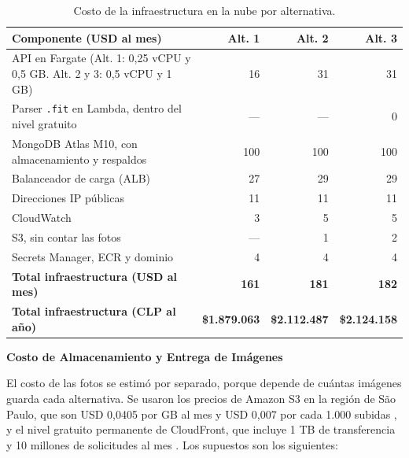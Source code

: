 \begin{table}[h!]
    \centering
    \renewcommand{\arraystretch}{1.25}
    \footnotesize
    \begin{tabular}{|>{\raggedright\arraybackslash}p{7.2cm}|r|r|r|}
        \hline
        \rowcolor[HTML]{EFEFEF}
        \textbf{Componente (USD al mes)} & \textbf{Alt. 1} & \textbf{Alt. 2} & \textbf{Alt. 3} \\ \hline
        API en Fargate (Alt. 1: 0,25 vCPU y 0,5 GB. Alt. 2 y 3: 0,5 vCPU y 1 GB) & 16 & 31 & 31 \\ \hline
        Parser \texttt{.fit} en Lambda, dentro del nivel gratuito & --- & --- & 0 \\ \hline
        MongoDB Atlas M10, con almacenamiento y respaldos & 100 & 100 & 100 \\ \hline
        Balanceador de carga (ALB) & 27 & 29 & 29 \\ \hline
        Direcciones IP públicas & 11 & 11 & 11 \\ \hline
        CloudWatch & 3 & 5 & 5 \\ \hline
        S3, sin contar las fotos & --- & 1 & 2 \\ \hline
        Secrets Manager, ECR y dominio & 4 & 4 & 4 \\ \hline
        \rowcolor[HTML]{FFF3E0}
        \textbf{Total infraestructura (USD al mes)} & \textbf{161} & \textbf{181} & \textbf{182} \\ \hline
        \rowcolor[HTML]{FFF3E0}
        \textbf{Total infraestructura (CLP al año)} & \textbf{\$1.879.063} & \textbf{\$2.112.487} & \textbf{\$2.124.158} \\ \hline
    \end{tabular}
    \caption{Costo de la infraestructura en la nube por alternativa.}
    \label{tab:costo_infra}
\end{table}

\newpage
\textbf{Costo de Almacenamiento y Entrega de Imágenes}

El costo de las fotos se estimó por separado, porque depende de cuántas imágenes guarda cada alternativa. Se usaron los precios de Amazon S3 en la región de São Paulo, que son USD 0,0405 por GB al mes y USD 0,007 por cada 1.000 subidas \citep{aws_s3_pricing}, y el nivel gratuito permanente de CloudFront, que incluye 1 TB de transferencia y 10 millones de solicitudes al mes \citep{aws_cloudfront_pricing}. Los supuestos son los siguientes:

